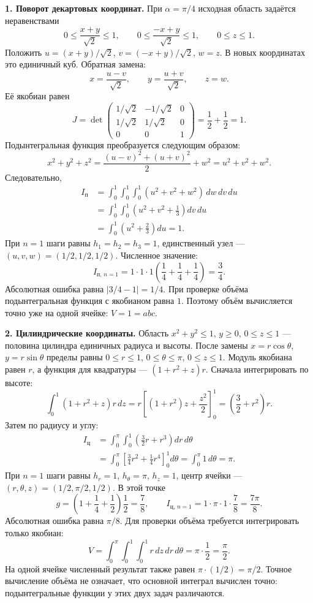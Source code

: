 \documentclass[12pt,a4paper]{article}
\begin{document}
\textbf{1. Поворот декартовых координат.}
При $\alpha=\pi/4$ исходная область задаётся неравенствами
\[
0\leq\frac{x+y}{\sqrt2}\leq1,\qquad
0\leq\frac{-x+y}{\sqrt2}\leq1,\qquad 0\leq z\leq1.
\]
Положить $u=(x+y)/\sqrt2$, $v=(-x+y)/\sqrt2$, $w=z$.
В новых координатах это единичный куб. Обратная замена:
\[
x=\frac{u-v}{\sqrt2},\qquad y=\frac{u+v}{\sqrt2},\qquad z=w.
\]
Её якобиан равен
\[
J=\det\begin{pmatrix}
1/\sqrt2&-1/\sqrt2&0\\
1/\sqrt2&1/\sqrt2&0\\
0&0&1
\end{pmatrix}=\frac12+\frac12=1.
\]
Подынтегральная функция преобразуется следующим образом:
\[
x^2+y^2+z^2=\frac{(u-v)^2+(u+v)^2}{2}+w^2=u^2+v^2+w^2.
\]
Следовательно,
\[
\begin{aligned}
I_{\mathrm{п}}
&=\int_0^1\int_0^1\int_0^1(u^2+v^2+w^2)\,dw\,dv\,du\\
&=\int_0^1\int_0^1\left(u^2+v^2+\frac13\right)dv\,du\\
&=\int_0^1\left(u^2+\frac23\right)du=1.
\end{aligned}
\]
При $n=1$ шаги равны $h_1=h_2=h_3=1$, единственный узел ---
$(u,v,w)=(1/2,1/2,1/2)$. Численное значение:
\[
I_{\mathrm{п},\,n=1}=1\cdot1\cdot1
\left(\frac14+\frac14+\frac14\right)=\frac34.
\]
Абсолютная ошибка равна $|3/4-1|=1/4$.
При проверке объёма подынтегральная функция с якобианом равна $1$.
Поэтому объём вычисляется точно уже на одной ячейке: $V=1=abc$.

\textbf{2. Цилиндрические координаты.}
Область $x^2+y^2\leq1$, $y\geq0$, $0\leq z\leq1$ --- половина
цилиндра единичных радиуса и высоты. После замены
$x=r\cos\theta$, $y=r\sin\theta$ пределы равны
$0\leq r\leq1$, $0\leq\theta\leq\pi$, $0\leq z\leq1$.
Модуль якобиана равен $r$, а функция для квадратуры --- $(1+r^2+z)r$.
Сначала интегрировать по высоте:
\[
\int_0^1(1+r^2+z)r\,dz
=r\left[(1+r^2)z+\frac{z^2}{2}\right]_0^1
=\left(\frac32+r^2\right)r.
\]
Затем по радиусу и углу:
\[
\begin{aligned}
I_{\mathrm{ц}}
&=\int_0^\pi\int_0^1\left(\frac32r+r^3\right)dr\,d\theta\\
&=\int_0^\pi\left[\frac34r^2+\frac14r^4\right]_0^1d\theta
=\int_0^\pi1\,d\theta=\pi.
\end{aligned}
\]
При $n=1$ шаги равны $h_r=1$, $h_\theta=\pi$, $h_z=1$,
центр ячейки --- $(r,\theta,z)=(1/2,\pi/2,1/2)$.
В этой точке
\[
g=\left(1+\frac14+\frac12\right)\frac12=\frac78,
\qquad I_{\mathrm{ц},\,n=1}=1\cdot\pi\cdot1\cdot\frac78=\frac{7\pi}{8}.
\]
Абсолютная ошибка равна $\pi/8$.
Для проверки объёма требуется интегрировать только якобиан:
\[
V=\int_0^\pi\int_0^1\int_0^1r\,dz\,dr\,d\theta
=\pi\cdot\frac12=\frac\pi2.
\]
На одной ячейке численный результат также равен $\pi\cdot(1/2)=\pi/2$.
Точное вычисление объёма не означает, что основной интеграл вычислен точно:
подынтегральные функции у этих двух задач различаются.
\end{document}
